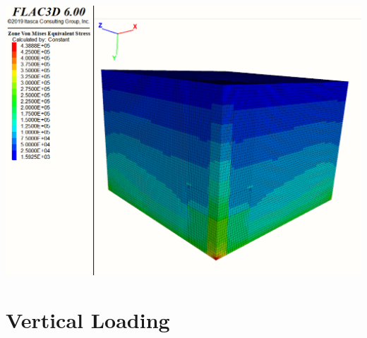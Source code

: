 \documentclass[a4paper, nobind]{templates/ociamthesis}
\begin{document}
\includegraphics[width=1\linewidth]{myfigureeeeee/ini_equil}

\hypertarget{vertical-loading}{%
\section{Vertical Loading}\label{vertical-loading}}
\end{document}
